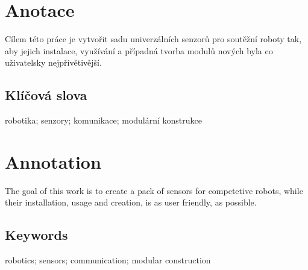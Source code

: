 \documentclass{template/socthesis}
\author{Tomáš Rohlínek}
\begin{document}
	\maketitle
	
	
	
	\pagestyle{empty}
	
	\section*{Anotace}
	Cílem této práce je vytvořit sadu univerzálních senzorů pro soutěžní roboty tak, aby jejich instalace, využívání a případná tvorba modulů nových byla co uživatelsky nejpřívětivější.
	
	\subsection*{Klíčová slova}
	robotika; senzory; komunikace; modulární konstrukce
	
	\vspace{20mm}
	
	\section*{Annotation}
	The goal of this work is to create a pack of sensors for competetive robots, while their installation, usage and creation, is as user friendly, as possible. 
	
	\subsection*{Keywords}
	robotics; sensors; communication; modular construction
	
	\newpage
	\pagestyle{plain}
	
	\tableofcontents %
	
	\setcounter{figure}{0}
	\setcounter{table}{0}
	\newpage
	
	
	
	
	
	
	
	
	
	
	
	
	
	
	
	
	\newpage
	\printbibliography[title=Literatura]
	
	\listoffigures
	
	\listoftables
	
	\listoflistedequation
	
\end{document}
